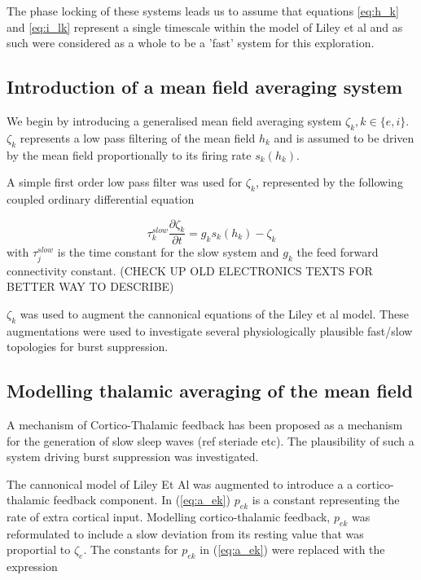 \documentclass[a4paper,12pt]{article}
\begin{document}
The phase locking of these systems leads us to assume that equations \ref{eq:h_k} and \ref{eq:i_lk} represent a single
timescale within the model of Liley et al and as such were considered as a whole to be a 'fast' system for this
exploration.

\subsection{Introduction of a mean field averaging system}

We begin by introducing a generalised mean field averaging system $\zeta_{k}, k \in \{e, i\}$.  $\zeta_{k}$ represents a low pass filtering of the mean field $h_k$ and is assumed to be driven by the mean field proportionally to its firing rate $s_{k}(h_{k})$.

A simple first order low pass filter was used for $\zeta_k$, represented by the following coupled ordinary differential equation

\begin{equation} \label{eq:zeta_slow} 
\tau_k^{slow} \frac{\partial \zeta_k}{\partial t} = g_k s_k(h_k) - \zeta_k
\end{equation}
with $\tau_j^{slow}$ is the time constant for the slow system and $g_k$ the feed forward connectivity
constant. (CHECK UP OLD ELECTRONICS TEXTS FOR BETTER WAY TO DESCRIBE)

$\zeta_{k}$ was used to augment the cannonical equations of the Liley et al model. These augmentations were used to investigate several physiologically plausible fast/slow topologies for burst suppression.

\subsection{Modelling thalamic averaging of the mean field}
A mechanism of Cortico-Thalamic feedback has been proposed as a mechanism for the generation of slow sleep waves (ref steriade etc). 
The plausibility of such a system driving burst suppression was investigated. 

The cannonical model of Liley Et Al was augmented to introduce a a cortico-thalamic feedback component. 
In (\ref{eq:a_ek}) $p_{ek}$ is a constant representing the rate of extra cortical input. Modelling cortico-thalamic feedback, $p_{ek}$ was reformulated to include a slow deviation from its resting value that was proportial to $\zeta_e$. The constants for $p_{ek}$ in (\ref{eq:a_ek}) were replaced with the expression
\end{document}
